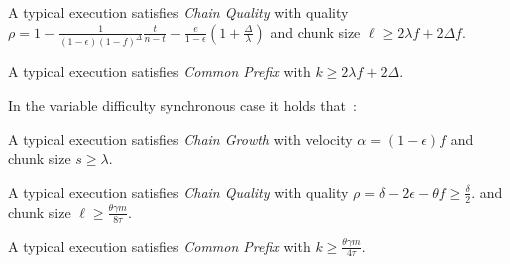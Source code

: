\begin{theorem}
  A typical execution satisfies \emph{Chain Quality} with
  quality
  $\rho = 1 - \frac{1}{(1 - \epsilon)(1 - f)^\Delta}\frac{t}{n - t} - \frac{e}{1 - \epsilon}(1 + \frac{\Delta}{\lambda})$
  and chunk size $\ell \geq 2\lambda f + 2\Delta f$.
\end{theorem}

\begin{theorem}
  A typical execution satisfies \emph{Common Prefix} with
  $k \geq 2\lambda f + 2\Delta$.
\end{theorem}

In the variable difficulty synchronous case it holds that~\cite{varbackbone}:

\begin{theorem}
  A typical execution satisfies \emph{Chain Growth} with
  velocity $\alpha = (1 - \epsilon)f$
  and chunk size $s \geq \lambda$.
\end{theorem}

\begin{theorem}
  A typical execution satisfies \emph{Chain Quality} with
  quality
  $\rho = \delta - 2\epsilon - \theta f \geq \frac{\delta}{2}$.
  and chunk size $\ell \geq \frac{\theta\gamma m}{8\tau}$.
\end{theorem}

\begin{theorem}
  A typical execution satisfies \emph{Common Prefix} with
  $k \geq \frac{\theta \gamma m}{4\tau}$.
\end{theorem}

